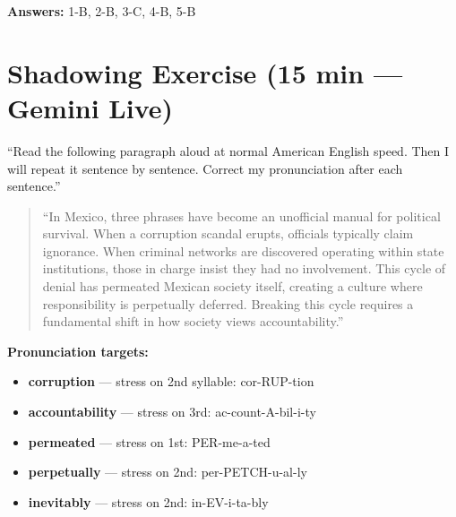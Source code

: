 \documentclass[10pt,a4paper]{article}
\begin{document}
\textbf{Answers:} 1-B, 2-B, 3-C, 4-B, 5-B

\section*{Shadowing Exercise (15 min --- Gemini Live)}

\begin{tcolorbox}[colback=white, colframe=black,
    title=Tell Gemini Live:]
``Read the following paragraph aloud at normal American English
speed. Then I will repeat it sentence by sentence. Correct my
pronunciation after each sentence.''
\end{tcolorbox}

\begin{quote}\small
``In Mexico, three phrases have become an unofficial manual for
political survival. When a corruption scandal erupts, officials
typically claim ignorance. When criminal networks are discovered
operating within state institutions, those in charge insist they
had no involvement. This cycle of denial has permeated Mexican
society itself, creating a culture where responsibility is
perpetually deferred. Breaking this cycle requires a fundamental
shift in how society views accountability.''
\end{quote}

\textbf{Pronunciation targets:}
\begin{itemize}[nosep]
\item \textbf{corruption} --- stress on 2nd syllable: cor-RUP-tion
\item \textbf{accountability} --- stress on 3rd: ac-count-A-bil-i-ty
\item \textbf{permeated} --- stress on 1st: PER-me-a-ted
\item \textbf{perpetually} --- stress on 2nd: per-PETCH-u-al-ly
\item \textbf{inevitably} --- stress on 2nd: in-EV-i-ta-bly
\end{itemize}
\end{document}
